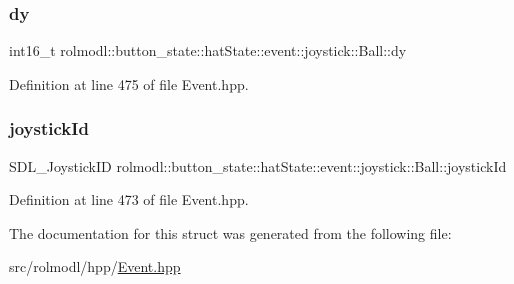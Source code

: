 \subsubsection{\texorpdfstring{dy}{dy}}
{\footnotesize\ttfamily int16\+\_\+t rolmodl\+::button\+\_\+state\+::hat\+State\+::event\+::joystick\+::\+Ball\+::dy}



Definition at line 475 of file Event.\+hpp.

\mbox{\label{structrolmodl_1_1button__state_1_1hat_state_1_1event_1_1joystick_1_1_ball_af9c8b9326e14dcba542a6471d1c06723}} 
\subsubsection{\texorpdfstring{joystickId}{joystickId}}
{\footnotesize\ttfamily S\+D\+L\+\_\+\+Joystick\+ID rolmodl\+::button\+\_\+state\+::hat\+State\+::event\+::joystick\+::\+Ball\+::joystick\+Id}



Definition at line 473 of file Event.\+hpp.



The documentation for this struct was generated from the following file\+:\begin{DoxyCompactItemize}
\item 
src/rolmodl/hpp/\mbox{\hyperlink{_event_8hpp}{Event.\+hpp}}\end{DoxyCompactItemize}

